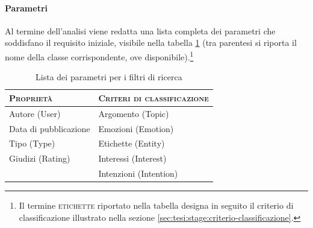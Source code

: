 \paragraph{Parametri}
Al termine dell'analisi viene redatta una lista completa dei parametri che soddisfano il requisito iniziale, visibile nella tabella \ref{tab:tesi:stage:parametri-filtri} (tra parentesi si riporta il nome della classe corrispondente, ove disponibile).\footnote{Il termine \textsc{etichette} riportato nella tabella designa in seguito il criterio di classificazione illustrato nella sezione \ref{sec:tesi:stage:criterio-classificazione}.}
\begin{table}[ht]
\centering
\begin{tabular}{|l|l|}
\hline
\textsc{Proprietà} & \textsc{Criteri di classificazione} \\ \hline
Autore (\textsf{User}) & Argomento (\textsf{Topic})\\
Data di pubblicazione & Emozioni (\textsf{Emotion}) \\
Tipo (\textsf{Type}) & Etichette (\textsf{Entity}) \\
Giudizi (\textsf{Rating}) & Interessi (\textsf{Interest}) \\
& Intenzioni (\textsf{Intention}) \\ \hline
\end{tabular}
\caption{Lista dei parametri per i filtri di ricerca}
\label{tab:tesi:stage:parametri-filtri}
\end{table}

